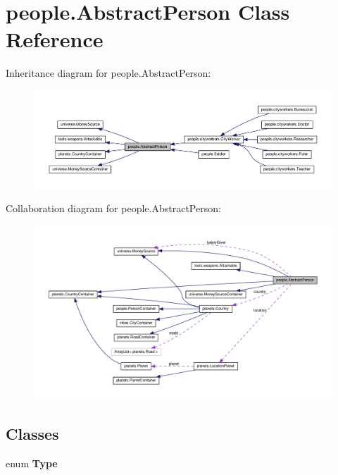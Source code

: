 \hypertarget{classpeople_1_1_abstract_person}{}\section{people.\+Abstract\+Person Class Reference}
\label{classpeople_1_1_abstract_person}


Inheritance diagram for people.\+Abstract\+Person\+:\nopagebreak
\begin{figure}[H]
\begin{center}
\leavevmode
\includegraphics[width=350pt]{classpeople_1_1_abstract_person__inherit__graph}
\end{center}
\end{figure}


Collaboration diagram for people.\+Abstract\+Person\+:\nopagebreak
\begin{figure}[H]
\begin{center}
\leavevmode
\includegraphics[width=350pt]{classpeople_1_1_abstract_person__coll__graph}
\end{center}
\end{figure}
\subsection*{Classes}
\begin{DoxyCompactItemize}
\item 
enum {\bfseries Type}
\end{DoxyCompactItemize}
